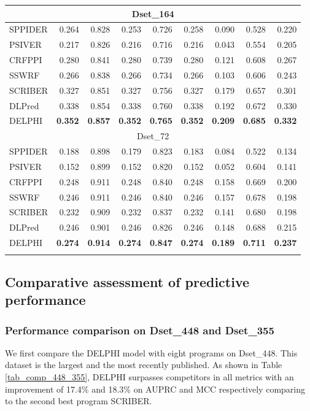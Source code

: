 \documentclass{bioinfo}
\begin{document}
\begin{table}[H]
\begin{tabular}{@{}l@{\ }*{8}{r}}
    \hline
    \multicolumn{9}{c}{Dset\_164} \\
    \hline
    SPPIDER & 0.264 & 0.828 & 0.253 & 0.726 & 0.258 & 0.090 & 0.528 & 0.220 \\
    PSIVER & 0.217 & 0.826 & 0.216 & 0.716 & 0.216 & 0.043 & 0.554 & 0.205 \\
    CRFPPI & 0.280 & 0.841 & 0.280 & 0.739 & 0.280 & 0.121 & 0.608 & 0.267 \\
    SSWRF & 0.266 & 0.838 & 0.266 & 0.734 & 0.266 & 0.103 & 0.606 & 0.243 \\
    SCRIBER & 0.327 & 0.851 & 0.327 & 0.756 & 0.327 & 0.179 & 0.657 & 0.301 \\
    DLPred & 0.338 & 0.854 & 0.338 & 0.760 & 0.338 & 0.192 & 0.672 & 0.330 \\
    DELPHI & \textbf{0.352} & \textbf{0.857} & \textbf{0.352} & \textbf{0.765} & \textbf{0.352} & \textbf{0.209} & \textbf{0.685} & \textbf{0.332} \\
    \hline
    \multicolumn{9}{c}{Dset\_72} \\
    \hline
    SPPIDER & 0.188 & 0.898 & 0.179 & 0.823 & 0.183 & 0.084 & 0.522 & 0.134 \\
    PSIVER & 0.152 & 0.899 & 0.152 & 0.820 & 0.152 & 0.052 & 0.604 & 0.141 \\
    CRFPPI & 0.248 & 0.911 & 0.248 & 0.840 & 0.248 & 0.158 & 0.669 & 0.200 \\
    SSWRF & 0.246 & 0.911 & 0.246 & 0.840 & 0.246 & 0.157 & 0.678 & 0.198 \\
    SCRIBER & 0.232 & 0.909 & 0.232 & 0.837 & 0.232 & 0.141 & 0.680 & 0.198 \\
    DLPred & 0.246 & 0.901 & 0.246 & 0.826 & 0.246 & 0.148 & 0.688 & 0.215 \\
    DELPHI & \textbf{0.274} & \textbf{0.914} & \textbf{0.274} & \textbf{0.847} & \textbf{0.274} & \textbf{0.189} & \textbf{0.711} & \textbf{0.237} \\
    \hline
\label{tab_ds186_164_72}
    \end{tabular}%
\end{table}%


\subsection{Comparative assessment of predictive performance}
\subsubsection{Performance comparison on Dset\_448 and Dset\_355}
We first compare the DELPHI model with eight programs on Dset\_448. This dataset is the largest and the most recently published. As shown in Table \ref{tab_comp_448_355}, DELPHI surpasses competitors in all metrics with an improvement of 17.4\% and 18.3\% on AUPRC and MCC respectively comparing to the second best program SCRIBER.
\end{document}
